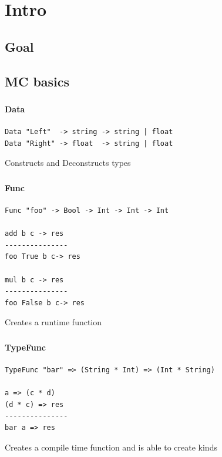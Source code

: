 \section{Intro}
\subsection{Goal}

\subsection{MC basics}

\begin{frame}[fragile]
   \frametitle{\subsecname}
   \framesubtitle{Data}

   \begin{lstlisting}
Data "Left"  -> string -> string | float
Data "Right" -> float  -> string | float
   \end{lstlisting}
   Constructs and Deconstructs types
\end{frame}

\begin{frame}[fragile]
   \frametitle{\subsecname}
   \framesubtitle{Func}

   \begin{lstlisting}
Func "foo" -> Bool -> Int -> Int -> Int

add b c -> res
---------------
foo True b c-> res

mul b c -> res
---------------
foo False b c-> res
   \end{lstlisting}
   Creates a runtime function
\end{frame}

\begin{frame}[fragile]
   \frametitle{\subsecname}
   \framesubtitle{TypeFunc}

   \begin{lstlisting}
TypeFunc "bar" => (String * Int) => (Int * String)

a => (c * d)
(d * c) => res
---------------
bar a => res
   \end{lstlisting}
   Creates a compile time function and is able to create kinds
\end{frame}

